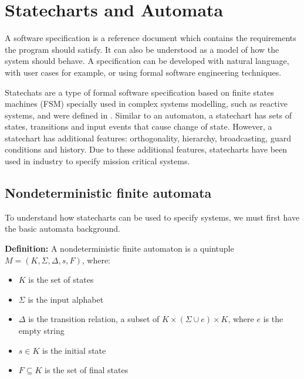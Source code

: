 \section{Statecharts and Automata}
\label{sec:statecharts}

A software specification is a reference document which contains the requirements the program should satisfy. It can also be understood as a model of how the system should behave. A specification can be developed with natural language, with user cases for example, or using formal software engineering techniques.

Statechats are a type of formal software specification based on finite states machines (FSM) specially used in complex systems modelling, such as reactive systems, and were defined in \cite{harel87:semantics_statecharts}. Similar to an automaton, a statechart has sets of states, transitions and input events that cause change of state. However, a statechart has additional features: orthogonality, hierarchy, broadcasting, guard conditions and history. Due to these additional features, statecharts have been used in industry to specify mission critical systems.

\subsection{Nondeterministic finite automata}

To understand how statecharts can be used to specify systems, we must first have the basic automata background.

\textbf{Definition\cite{Lewis:98}:} A nondeterministic finite automaton is a quintuple $M = (K,\Sigma,\Delta,s,F)$, where:

\begin{itemize}

\item $K$ is the set of states

\item $\Sigma$ is the input alphabet

\item $\Delta$ is the transition relation, a subset of $K\times(\Sigma\cup{e})\times K$, where $e$ is the empty string

\item $s \in K$ is the initial state

\item $F \subseteq K$ is the set of final states
\end{itemize}

